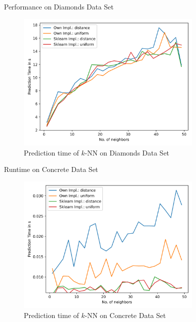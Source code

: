\documentclass[10pt]{beamer}
\begin{document}
    \begin{frame}{Performance on Diamonds Data Set}
        \begin{figure}[h!]
            \centering
            \includegraphics[width=0.8\textwidth]{exercise_2/presentation/figures/diamond_knn_scores_runtime.png}
            \caption{Prediction time of $k$-NN on Diamonds Data Set}
            \label{fig:kNN_Diamond_runtime}
       \end{figure}
    \end{frame}
    
    \begin{frame}{Runtime on Concrete Data Set}
        \begin{figure}[h!]
            \centering
            \includegraphics[width=0.8\textwidth]{exercise_2/presentation/figures/concrete_knn_scores_runtime.png}
            \caption{Prediction time of $k$-NN on Concrete Data Set}
            \label{fig:kNN_concrete_runtime}
       \end{figure}
    \end{frame}
    
\end{document}
